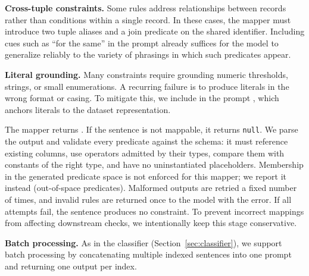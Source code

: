 \smallskip\noindent\textbf{Cross-tuple constraints.}
Some rules address relationships between records rather than conditions 
within a single record. In these cases, the mapper must introduce two 
tuple aliases and a join predicate on the shared identifier. %
Including cues such as ``for the same'' in the prompt
already suffices for the model to generalize reliably to the variety of phrasings in which such predicates appear.



\smallskip\noindent\textbf{Literal grounding.}
Many constraints require grounding numeric thresholds, strings, or small 
enumerations. A recurring failure is to produce literals in the wrong 
format or casing. To mitigate this, we include in the prompt , which anchors 
literals to the dataset representation.

The mapper returns . If the sentence is not mappable, it returns \texttt{null}. We parse the output and validate every predicate against the schema: it must reference existing columns, use operators admitted by their types, compare them with constants of the right type, and have no uninstantiated placeholders. Membership in the generated predicate space is not enforced for this mapper; we report it instead (out-of-space predicates). Malformed outputs are retried a fixed number of times, and invalid rules are returned once to the model with the error. If all attempts fail, the sentence produces no constraint. To prevent incorrect mappings from affecting downstream checks, we intentionally keep this stage conservative.


\smallskip\noindent\textbf{Batch processing.}
As in the classifier (Section~\ref{sec:classifier}), we support batch processing by concatenating multiple indexed sentences into one prompt and returning one output per index. 

